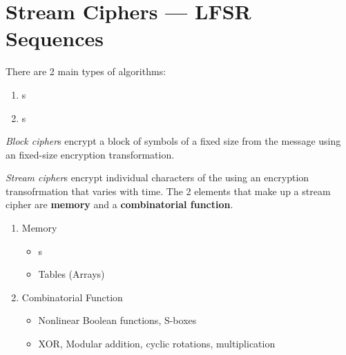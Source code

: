 \section{Stream Ciphers --- LFSR Sequences}\label{sec:Stream_Ciphers}
There are 2 main types of  algorithms:
\begin{enumerate}[noitemsep]
\item {}s
\item {}s
\end{enumerate}

\begin{definition}\label{def:Block_Cipher}
  \emph{Block cipher}s encrypt a block of symbols of a fixed size from the  message using an fixed-size encryption transformation.
\end{definition}

\begin{definition}\label{def:Stream_Cipher}
  \emph{Stream cipher}s encrypt individual characters of the  using an encryption transofrmation that varies with time.
  The 2 elements that make up a stream cipher are \textbf{memory} and a \textbf{combinatorial function}.
  \begin{enumerate}[noitemsep]
  \item Memory
    \begin{itemize}[noitemsep]
    \item {}s
    \item Tables (Arrays)
    \end{itemize}
  \item Combinatorial Function
    \begin{itemize}[noitemsep]
    \item Nonlinear Boolean functions, S-boxes
    \item XOR, Modular addition, cyclic rotations, multiplication
    \end{itemize}
  \end{enumerate}
\end{definition}

